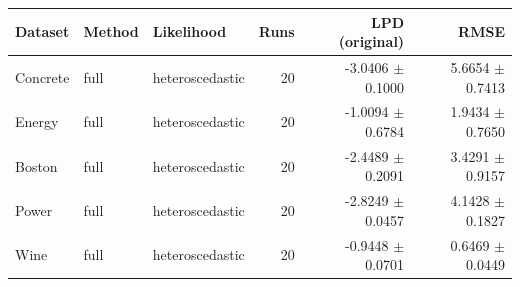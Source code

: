 \begin{tabular}{lllrrr}
\toprule
Dataset & Method & Likelihood & Runs & LPD (original) & RMSE \\
\midrule
Concrete & full & heteroscedastic & 20 & -3.0406 $\pm$ 0.1000 & 5.6654 $\pm$ 0.7413 \\
Energy & full & heteroscedastic & 20 & -1.0094 $\pm$ 0.6784 & 1.9434 $\pm$ 0.7650 \\
Boston & full & heteroscedastic & 20 & -2.4489 $\pm$ 0.2091 & 3.4291 $\pm$ 0.9157 \\
Power & full & heteroscedastic & 20 & -2.8249 $\pm$ 0.0457 & 4.1428 $\pm$ 0.1827 \\
Wine & full & heteroscedastic & 20 & -0.9448 $\pm$ 0.0701 & 0.6469 $\pm$ 0.0449 \\
\bottomrule
\end{tabular}
